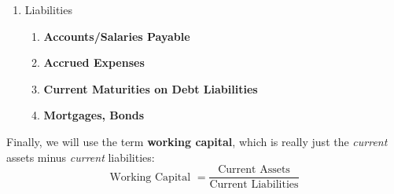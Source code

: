 \documentclass{article}
\begin{document}
\begin{enumerate}
    \item Liabilities
    \begin{enumerate}
      \item \textbf{Accounts/Salaries Payable}
      \item \textbf{Accrued Expenses}
      \item \textbf{Current Maturities on Debt Liabilities}
      \item \textbf{Mortgages, Bonds}
    \end{enumerate}
    \end{enumerate}
    Finally, we will use the term \textbf{working capital}, which is really just the \textit{current} assets minus \textit{current} liabilities:
    \begin{equation}
      \text{Working Capital } = \frac{\text{Current Assets}}{\text{Current Liabilities}}
    \end{equation}
\end{document}
